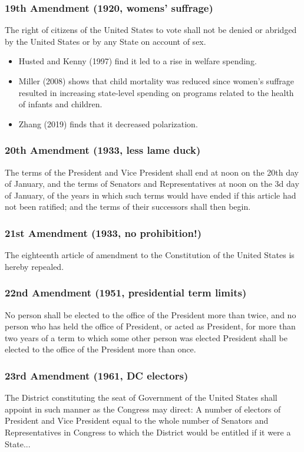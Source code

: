 \documentclass[aspectratio=169]{beamer}
\theoremstyle{principle}
\begin{document}
\begin{frame}
\frametitle{19th Amendment (1920, womens' suffrage)}
The right of citizens of the United States to vote shall not be denied or abridged by the United States or by any State on account of sex.
\begin{itemize}
\item Husted and Kenny (1997) find it led to a rise in welfare spending.
\item Miller (2008) shows that child mortality was reduced since women's suffrage resulted in increasing state-level spending on programs related to the health of infants and children.
\item Zhang (2019) finds that it decreased polarization.
\end{itemize}
\end{frame}

\begin{frame}
\frametitle{20th Amendment (1933, less lame duck)}
The terms of the President and Vice President shall end at noon on the 20th day of January, and the terms of Senators and Representatives at noon on the 3d day of January, of the years in which such terms would have ended if this article had not been ratified; and the terms of their successors shall then begin. 
\end{frame}

\begin{frame}
\frametitle{21st Amendment (1933, no prohibition!)}
The eighteenth article of amendment to the Constitution of the United States is hereby repealed. 
\end{frame}

\begin{frame}
\frametitle{22nd Amendment (1951, presidential term limits)}
No person shall be elected to the office of the President more than twice, and no person who has held the office of President, or acted as President, for more than two years of a term to which some other person was elected President shall be elected to the office of the President more than once.
\end{frame}

\begin{frame}
\frametitle{23rd Amendment (1961, DC electors)}
The District constituting the seat of Government of the United States shall appoint in such manner as the Congress may direct: A number of electors of President and Vice President equal to the whole number of Senators and Representatives in Congress to which the District would be entitled if it were a State...
\end{frame}
\end{document}
